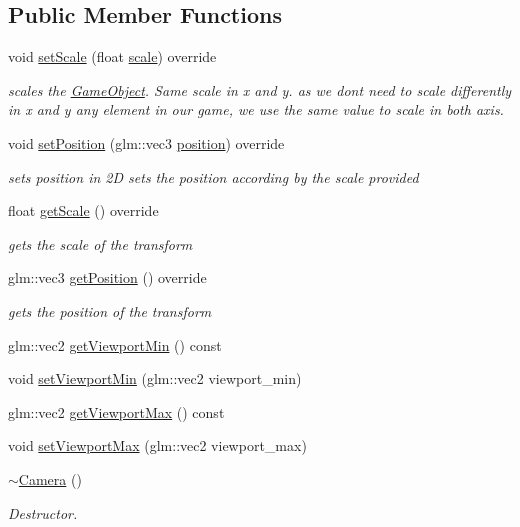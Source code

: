 \subsection*{Public Member Functions}
\begin{DoxyCompactItemize}
\item 
void \hyperlink{class_mason_1_1_camera_af7aa6752699108d282996199549a704b}{set\+Scale} (float \hyperlink{class_mason_1_1_transform_a0a12711710700aca2523630c1014dc17}{scale}) override
\begin{DoxyCompactList}\small\item\em scales the \hyperlink{class_mason_1_1_game_object}{Game\+Object}. Same scale in x and y. as we don\textquotesingle{}t need to scale differently in x and y any element in our game, we use the same value to scale in both axis. \end{DoxyCompactList}\item 
void \hyperlink{class_mason_1_1_camera_a69f184af46d081b85209040bbe814cbb}{set\+Position} (glm\+::vec3 \hyperlink{class_mason_1_1_transform_ac9e11b4ec4433a38ac1100f12c955dcb}{position}) override
\begin{DoxyCompactList}\small\item\em sets position in 2D sets the position according by the scale provided \end{DoxyCompactList}\item 
float \hyperlink{class_mason_1_1_camera_a9c86fd4a182c472001f5d52e99fc0bbc}{get\+Scale} () override
\begin{DoxyCompactList}\small\item\em gets the scale of the transform \end{DoxyCompactList}\item 
glm\+::vec3 \hyperlink{class_mason_1_1_camera_a71560b8b6216a542ae1958bd91a4361d}{get\+Position} () override
\begin{DoxyCompactList}\small\item\em gets the position of the transform \end{DoxyCompactList}\item 
glm\+::vec2 \hyperlink{class_mason_1_1_camera_a0d2d26d8b7b80ab508ed4f4f537614b5}{get\+Viewport\+Min} () const
\item 
void \hyperlink{class_mason_1_1_camera_aa630259d7e0c0124dec5c9aaf33b7160}{set\+Viewport\+Min} (glm\+::vec2 viewport\+\_\+min)
\item 
glm\+::vec2 \hyperlink{class_mason_1_1_camera_abe43550148e85f5a32919a3c8b8ff115}{get\+Viewport\+Max} () const
\item 
void \hyperlink{class_mason_1_1_camera_a1f9a7896bb617d1402e3c4738324e1ea}{set\+Viewport\+Max} (glm\+::vec2 viewport\+\_\+max)
\item 
\hyperlink{class_mason_1_1_camera_ad1897942d0ccf91052386388a497349f}{$\sim$\+Camera} ()
\begin{DoxyCompactList}\small\item\em Destructor. \end{DoxyCompactList}\end{DoxyCompactItemize}
